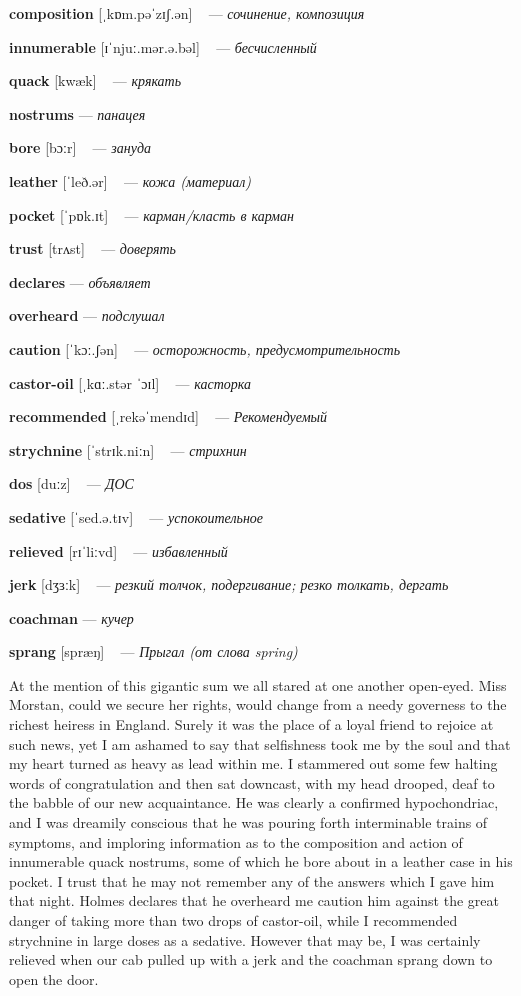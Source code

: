 \documentclass[a4paper,oneside,12pt]{amsart}
\begin{document}
{{\bf composition } [ˌkɒm.pəˈzɪʃ.ən] ~ --- \emph{ сочинение, композиция }

{\bf innumerable } [ɪˈnjuː.mər.ə.bəl] ~ --- \emph{ бесчисленный }

{\bf quack } [kwæk] ~ --- \emph{ крякать }

{\bf nostrums } --- \emph{ панацея }

{\bf bore } [bɔːr] ~ --- \emph{ зануда }

{\bf leather } [ˈleð.ər] ~ --- \emph{ кожа (материал) }

{\bf pocket } [ˈpɒk.ɪt] ~ --- \emph{ карман/класть в карман }

{\bf trust } [trʌst] ~ --- \emph{ доверять }

{\bf declares } --- \emph{ объявляет }

{\bf overheard } --- \emph{ подслушал }

{\bf caution } [ˈkɔː.ʃən] ~ --- \emph{ осторожность, предусмотрительность }

{\bf castor-oil } [ˌkɑː.stər ˈɔɪl] ~ --- \emph{ касторка }

{\bf recommended } [ˌrekəˈmendɪd] ~ --- \emph{ Рекомендуемый }

{\bf strychnine } [ˈstrɪk.niːn] ~ --- \emph{ стрихнин }

{\bf dos } [duːz] ~ --- \emph{ ДОС }

{\bf sedative } [ˈsed.ə.tɪv] ~ --- \emph{ успокоительное }

{\bf relieved } [rɪˈliːvd] ~ --- \emph{ избавленный }

{\bf jerk } [dʒɜːk] ~ --- \emph{ резкий толчок, подергивание; резко толкать, дергать }

{\bf coachman } --- \emph{ кучер }

{\bf sprang } [spræŋ] ~ --- \emph{ Прыгал (от слова spring) }

} \vspace{6mm} {\Large 

 
At the mention of this gigantic sum we all stared at one another open-eyed. Miss Morstan, could we secure her rights, would change from a needy governess to the richest heiress in England. Surely it was the place of a loyal friend to rejoice at such news, yet I am ashamed to say that selfishness took me by the soul and that my heart turned as heavy as lead within me. I stammered out some few halting words of congratulation and then sat downcast, with my head drooped, deaf to the babble of our new acquaintance. He was clearly a confirmed hypochondriac, and I was dreamily conscious that he was pouring forth interminable trains of symptoms, and imploring information as to the composition and action of innumerable quack nostrums, some of which he bore about in a leather case in his pocket. I trust that he may not remember any of the answers which I gave him that night. Holmes declares that he overheard me caution him against the great danger of taking more than two drops of castor-oil, while I recommended strychnine in large doses as a sedative. However that may be, I was certainly relieved when our cab pulled up with a jerk and the coachman sprang down to open the door.
\\ } 
\end{document}
